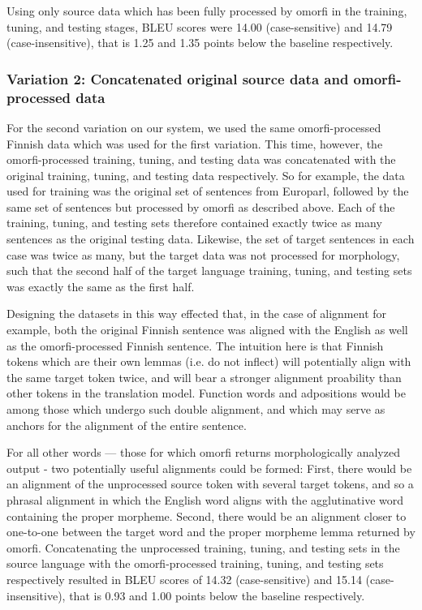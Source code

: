 Using only source data which has been fully processed by omorfi in the training, tuning, and testing stages, BLEU scores were 14.00 (case-sensitive) and 14.79 (case-insensitive), that is 1.25 and 1.35 points below the baseline respectively.


\subsubsection{Variation 2: Concatenated original source data and omorfi-processed data}
\label{sec:fienv2}

For the second variation on our system, we used the same omorfi-processed Finnish data which was used for the first variation.
%
This time, however, the omorfi-processed training, tuning, and testing data was concatenated with the original training, tuning, and testing data respectively.
%
So for example, the data used for training was the original set of sentences from Europarl, followed by the same set of sentences but processed by omorfi as described above.
%
Each of the training, tuning, and testing sets therefore contained exactly twice as many sentences as the original testing data.
%
Likewise, the set of target sentences in each case was twice as many, but the target data was not processed for morphology, such that the second half of the target language training, tuning, and testing sets was exactly the same as the first half.

Designing the datasets in this way effected that, in the case of alignment for example, both the original Finnish sentence was aligned with the English as well as the omorfi-processed Finnish sentence.
%
The intuition here is that Finnish tokens which are their own lemmas (i.e. do not inflect) will potentially align with the same target token twice, and will bear a stronger alignment proability than other tokens in the translation model.
%
Function words and adpositions would be among those which undergo such double alignment, and which may serve as anchors for the alignment of the entire sentence.

For all other words --- those for which omorfi returns morphologically analyzed output - two potentially useful alignments could be formed:
%
First, there would be an alignment of the unprocessed source token with several target tokens, and so a phrasal alignment in which the English word aligns with the agglutinative word containing the proper morpheme.
%
Second, there would be an alignment closer to one-to-one between the target word and the proper morpheme lemma returned by omorfi.
%
Concatenating the unprocessed training, tuning, and testing sets in the source language with the omorfi-processed training, tuning, and testing sets respectively resulted in BLEU scores of 14.32 (case-sensitive) and 15.14 (case-insensitive), that is 0.93 and 1.00 points below the baseline respectively.

